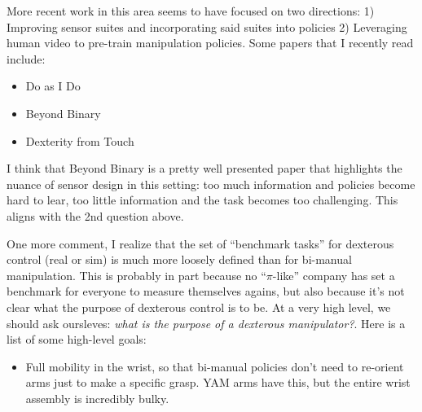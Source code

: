 \documentclass{article}
\begin{document}
More recent work in this area seems to have focused on two directions: 1) Improving sensor suites and incorporating said suites into policies 2) Leveraging human video to pre-train manipulation policies. Some papers that I recently read include:
\begin{itemize}
    \item Do as I Do \citep{paliwal2026doasido}
    \item Beyond Binary \citep{pan2026beyondbinary}
    \item Dexterity from Touch \citep{guzey2023dexterity}
\end{itemize}

\noindent I think that Beyond Binary is a pretty well presented paper that highlights the nuance of sensor design in this setting: too much information and policies become hard to lear, too little information and the task becomes too challenging. This aligns with the 2nd question above. 

One more comment, I realize that the set of ``benchmark tasks'' for dexterous control (real or sim) is much more loosely defined than for bi-manual manipulation. This is probably in part because no ``$\pi$-like'' company has set a benchmark for everyone to measure themselves agains, but also because it's not clear what the purpose of dexterous control is to be. At a very high level, we should ask oursleves: \emph{what is the purpose of a dexterous manipulator?}. Here is a list of some high-level goals:
\begin{itemize}
    \item Full mobility in the wrist, so that bi-manual policies don't need to re-orient arms just to make a specific grasp. YAM arms have this, but the entire wrist assembly is incredibly bulky.
\end{itemize}

\newpage


\end{document}
